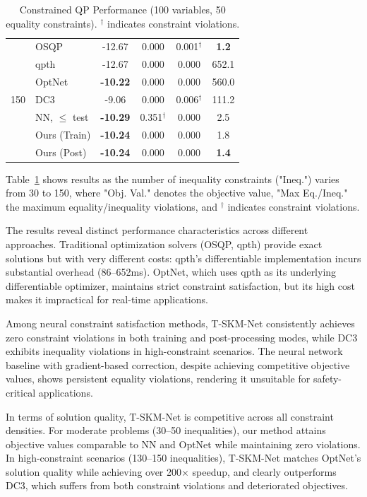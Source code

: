 \documentclass[letterpaper]{article} %
\begin{document}
\begin{table}[t]
\begin{tabular}{llcccc}
\midrule
\multirow{7}{*}{150} & OSQP & -12.67 & 0.000 & 0.001$^{\dagger}$ & \textbf{1.2} \\
 & qpth & -12.67 & 0.000 & 0.000 & 652.1 \\
 & OptNet & \textbf{-10.22} & 0.000 & 0.000 & 560.0 \\
 & DC3 & -9.06 & 0.000 & 0.006$^{\dagger}$ & 111.2 \\
 & NN, $\leq$ test & \textbf{-10.29} & 0.351$^{\dagger}$ & 0.000 & 2.5 \\
 & Ours (Train) & \textbf{-10.24} & 0.000 & 0.000 & 1.8 \\
 & Ours (Post) & \textbf{-10.24} & 0.000 & 0.000 & \textbf{1.4} \\
\bottomrule
\end{tabular}
\caption{Constrained QP Performance (100 variables, 50 equality constraints). $^{\dagger}$ indicates constraint violations.}
\label{tab:qp}
\end{table}

Table~\ref{tab:qp} shows results as the number of inequality constraints ("Ineq.") varies from 30 to 150, where "Obj. Val." denotes the objective value, "Max Eq./Ineq." the maximum equality/inequality violations, and $^{\dagger}$ indicates constraint violations. 

The results reveal distinct performance characteristics across different approaches. Traditional optimization solvers (OSQP, qpth) provide exact solutions but with very different costs: qpth’s differentiable implementation incurs substantial overhead (86–652ms). OptNet, which uses qpth as its underlying differentiable optimizer, maintains strict constraint satisfaction, but its high cost makes it impractical for real-time applications. 

Among neural constraint satisfaction methods, T-SKM-Net consistently achieves zero constraint violations in both training and post-processing modes, while DC3 exhibits inequality violations in high-constraint scenarios. The neural network baseline with gradient-based correction, despite achieving competitive objective values, shows persistent equality violations, rendering it unsuitable for safety-critical applications. 

In terms of solution quality, T-SKM-Net is competitive across all constraint densities. For moderate problems (30–50 inequalities), our method attains objective values comparable to NN and OptNet while maintaining zero violations. In high-constraint scenarios (130–150 inequalities), T-SKM-Net matches OptNet’s solution quality while achieving over 200$\times$ speedup, and clearly outperforms DC3, which suffers from both constraint violations and deteriorated objectives. 
\end{document}
